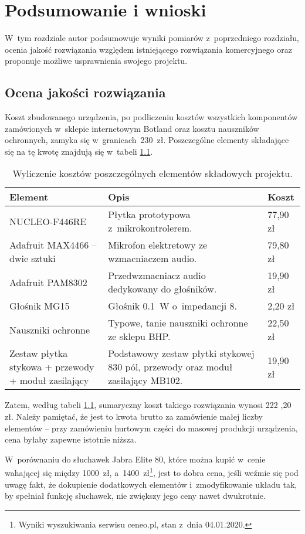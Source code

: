 \chapter{Podsumowanie i wnioski}
\label{cha:wnioski}
W~tym rozdziale autor podsumowuje wyniki pomiarów z~poprzedniego rozdziału, ocenia jakość rozwiązania względem istniejącego rozwiązania komercyjnego oraz proponuje możliwe usprawnienia swojego projektu.
\section{Ocena jakości rozwiązania}
Koszt zbudowanego urządzenia, po podliczeniu kosztów wszystkich komponentów zamówionych w~sklepie internetowym Botland oraz kosztu nauszników ochronnych, zamyka się w~granicach~230~zł. Poszczególne elementy składające się na tę kwotę znajdują się w~tabeli \ref{tab:costs}.
\begin{table}[h!]
	\centering
	\caption{Wyliczenie kosztów poszczególnych elementów składowych projektu.}
	\label{tab:costs}
		\begin{tabular}{|p{} | p{} | p{}|}
		\hline 
		Element & Opis & Koszt \\ 
		\hline\hline
		NUCLEO-F446RE & Płytka prototypowa z~mikrokontrolerem. & 77,90 zł \\ 
		\hline
		Adafruit MAX4466 -- dwie sztuki & Mikrofon elektretowy ze wzmacniaczem audio. & 79,80 zł \\
		\hline
		Adafruit PAM8302 & Przedwzmacniacz audio dedykowany do głośników. & 19,90 zł \\
		\hline
		Głośnik MG15 & Głośnik \SI{0,1}{\W} o~impedancji \SI{8}{\Omega}. & 2,20 zł \\
		\hline
		Nauszniki ochronne & Typowe, tanie nauszniki ochronne ze sklepu BHP. & 22,50 zł \\
		\hline
		Zestaw płytka stykowa + przewody + moduł zasilający & Podstawowy zestaw płytki stykowej 830 pól, przewody oraz moduł zasilający MB102. & 19,90 zł \\
		\hline
	\end{tabular}
\end{table}

Zatem, według tabeli \ref{tab:costs}, sumaryczny koszt takiego rozwiązania wynosi 222 ,20 zł. Należy pamiętać, że jest to kwota brutto za zamówienie małej liczby elementów -- przy zamówieniu hurtowym części do masowej produkcji urządzenia, cena byłaby zapewne istotnie niższa.

W~porównaniu do słuchawek Jabra Elite 80, które można kupić w~cenie wahającej się między 1000~zł, a~1400~zł\footnote{Wyniki wyszukiwania serwisu ceneo.pl, stan z~dnia 04.01.2020.}, jest to dobra cena, jeśli weźmie się pod uwagę fakt, że dokupienie dodatkowych elementów i~zmodyfikowanie układu tak, by spełniał funkcję słuchawek, nie zwiększy jego ceny nawet dwukrotnie.

